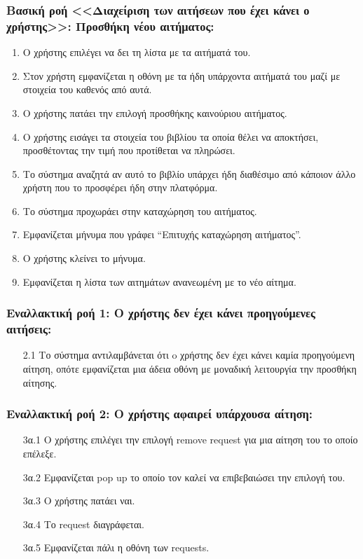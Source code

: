 \documentclass[12pt,a4paper]{article}
\begin{document}
\subsubsection*{Βασική ροή <<Διαχείριση των αιτήσεων που έχει κάνει ο χρήστης>>: Προσθήκη νέου αιτήματος:}
\begin{enumerate}
    \item Ο χρήστης επιλέγει να δει τη λίστα με τα αιτήματά του.
    \item Στον χρήστη εμφανίζεται η οθόνη με τα ήδη υπάρχοντα αιτήματά του μαζί με στοιχεία του καθενός από αυτά.
    \item Ο χρήστης πατάει την επιλογή προσθήκης καινούριου αιτήματος.
    \item Ο χρήστης εισάγει τα στοιχεία του βιβλίου τα οποία θέλει να αποκτήσει, προσθέτοντας την τιμή που προτίθεται να πληρώσει.
    \item Το σύστημα αναζητά αν αυτό το βιβλίο υπάρχει ήδη διαθέσιμο από κάποιον άλλο χρήστη που το προσφέρει ήδη στην πλατφόρμα.
    \item Το σύστημα προχωράει στην καταχώρηση του αιτήματος.
    \item Εμφανίζεται μήνυμα που γράφει “Επιτυχής καταχώρηση αιτήματος”.
    \item Ο χρήστης κλείνει το μήνυμα.
    \item Εμφανίζεται η λίστα των αιτημάτων ανανεωμένη με το νέο αίτημα.
\end{enumerate}

\subsubsection*{Εναλλακτική ροή 1: Ο χρήστης δεν έχει κάνει προηγούμενες αιτήσεις:}
\begin{enumerate}
    \item [2.1] Το σύστημα αντιλαμβάνεται ότι o χρήστης δεν έχει κάνει καμία προηγούμενη αίτηση, οπότε εμφανίζεται μια άδεια οθόνη με μοναδική λειτουργία την προσθήκη αίτησης.
\end{enumerate}

\subsubsection*{Εναλλακτική ροή 2: Ο χρήστης αφαιρεί υπάρχουσα αίτηση:}
\begin{enumerate}
    \item [3α.1] Ο χρήστης επιλέγει την επιλογή remove request για μια αίτηση του το οποίο επέλεξε.
    \item [3α.2] Εμφανίζεται pop up το οποίο τον καλεί να επιβεβαιώσει την επιλογή του.
    \item [3α.3] Ο χρήστης πατάει ναι.
    \item [3α.4] Το request διαγράφεται.
    \item [3α.5] Εμφανίζεται πάλι η οθόνη των requests.
\end{enumerate}
\end{document}
